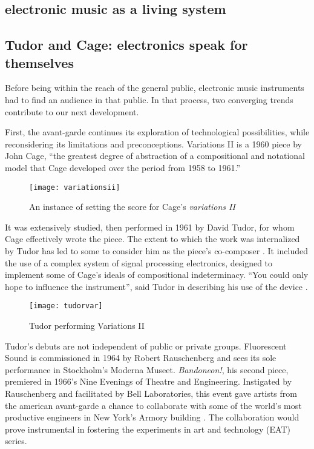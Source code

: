 \begin{itemize}
\section{electronic music as a living system}

\subsection{Tudor and Cage: electronics speak for themselves}

	Before being within the reach of the general public, electronic music instruments had to find an audience in that public. In that process, two converging trends contribute to our next development. 
	
	First, the avant-garde continues its exploration of technological possibilities, while reconsidering its limitations and preconceptions. Variations II is a 1960 piece by John Cage, “the greatest degree of abstraction of a compositional and notational model that Cage developed over the period from 1958 to 1961.”
	
\begin{figure}[h!]
  \caption{An instance of setting the score for Cage's \emph{variations II}}
  \centering
    \texttt{[image: variationsii]}
\end{figure}
	
	 It was extensively studied, then performed in 1961 by David Tudor, for whom Cage effectively wrote the piece. The extent to which the work was internalized by Tudor has led to some to consider him as the piece’s co-composer \cite{pritchett2004}. It included the use of a complex system of signal processing electronics, designed to implement some of Cage’s ideals of compositional indeterminacy. “You could only hope to influence the instrument”, said Tudor in describing his use of the device \cite{nakai2014}. 
	 
 	\begin{figure}[h!]
 	  \caption{Tudor performing Variations II}
 	  \centering
 	    \texttt{[image: tudorvar]}
 	\end{figure}

Tudor’s debuts are not independent of public or private groups. Fluorescent Sound is commissioned in 1964 by Robert Rauschenberg and sees its sole performance in Stockholm’s Moderna Museet. \emph{Bandoneon!}, his second piece, premiered in 1966’s Nine Evenings of Theatre and Engineering. Instigated by Rauschenberg and facilitated by Bell Laboratories, this event gave artists from the american avant-garde a chance to collaborate with some of the world’s most productive engineers in New York’s Armory building \cite{kuivila2004}. The collaboration would prove instrumental in fostering the experiments in art and technology (EAT) series. 
	

\end{itemize}
